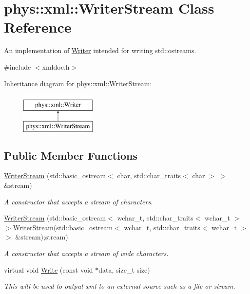 \hypertarget{classphys_1_1xml_1_1WriterStream}{
\section{phys::xml::WriterStream Class Reference}
\label{d5/d6f/classphys_1_1xml_1_1WriterStream}
}


An implementation of \hyperlink{classphys_1_1xml_1_1Writer}{Writer} intended for writing std::ostreams.  




{\ttfamily \#include $<$xmldoc.h$>$}

Inheritance diagram for phys::xml::WriterStream:\begin{figure}[H]
\begin{center}
\leavevmode
\includegraphics[height=2.000000cm]{d5/d6f/classphys_1_1xml_1_1WriterStream}
\end{center}
\end{figure}
\subsection*{Public Member Functions}
\begin{DoxyCompactItemize}
\item 
\hyperlink{classphys_1_1xml_1_1WriterStream_ae170ab7c429b6f7149d3540243329dfa}{WriterStream} (std::basic\_\-ostream$<$ char, std::char\_\-traits$<$ char $>$ $>$ \&stream)
\begin{DoxyCompactList}\small\item\em A constructor that accepts a stream of characters. \item\end{DoxyCompactList}\item 
\hyperlink{classphys_1_1xml_1_1WriterStream_a956ab44aab151867738a77c42de35495}{WriterStream} (std::basic\_\-ostream$<$ wchar\_\-t, std::char\_\-traits$<$ wchar\_\-t $>$ $>$\hyperlink{classphys_1_1xml_1_1WriterStream}{WriterStream}(std::basic\_\-ostream$<$ wchar\_\-t, std::char\_\-traits$<$ wchar\_\-t $>$ $>$ \&stream);stream)
\begin{DoxyCompactList}\small\item\em A constructor that accepts a stream of wide characters. \item\end{DoxyCompactList}\item 
virtual void \hyperlink{classphys_1_1xml_1_1WriterStream_a74242c8abe03f6244d3464a663f75de9}{Write} (const void $\ast$data, size\_\-t size)
\begin{DoxyCompactList}\small\item\em This will be used to output xml to an external source such as a file or stream. \item\end{DoxyCompactList}\end{DoxyCompactItemize}


